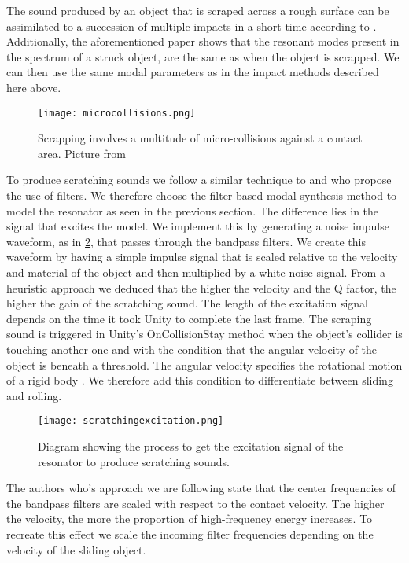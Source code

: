The sound produced by an object that is scraped across a rough surface can be assimilated to a succession of multiple impacts in a short time according to \cite{gaver1993we}. Additionally, the aforementioned paper shows that the resonant modes present in the spectrum of a struck object, are the same as when the object is scrapped. We can then use the same modal parameters as in the impact methods described here above.

\begin{figure}[H]
  \centering
    \texttt{[image: microcollisions.png]}
      \caption{Scrapping involves a multitude of micro-collisions against a contact area. Picture from \cite{gaver1993we}}
      \label{fig:microcollisions}
\end{figure}

To produce scratching sounds we follow a similar technique to \cite{gaver1993we} and \cite{van2001foleyautomatic} who propose the use of filters. We therefore choose the filter-based modal synthesis method to model the resonator as seen in the previous section. The difference lies in the signal that excites the model. We implement this by generating a noise impulse waveform, as in \ref{fig:scratchingimpulse}, that passes through the bandpass filters. We create this waveform by having a simple impulse signal that is scaled relative to the velocity and material of the object and then multiplied by a white noise signal. From a heuristic approach we deduced that the higher the velocity and the Q factor, the higher the gain of the scratching sound. The length of the excitation signal depends on the time it took Unity to complete the last frame. The scraping sound is triggered in Unity's OnCollisionStay method when the object's collider is touching another one and with the condition that the angular velocity of the object is beneath a threshold. The angular velocity specifies the rotational motion of a rigid body \cite{sears1964university}. We therefore add this condition to differentiate between sliding and rolling.

\begin{figure}[H]
  \centering
    \texttt{[image: scratchingexcitation.png]}
      \caption{Diagram showing the process to get the excitation signal of the resonator to produce scratching sounds.}
      \label{fig:scratchingimpulse}
\end{figure} 

The authors who's approach we are following state that the center frequencies of the bandpass filters are scaled with respect to the contact velocity. The higher the velocity, the more the proportion of high-frequency energy increases. To recreate this effect we scale the incoming filter frequencies depending on the velocity of the sliding object.

